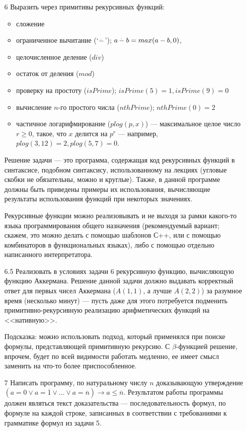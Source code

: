 \documentclass[11pt,a4paper,oneside]{book}
\begin{document}
\begin{enumerate}
\item[6] Выразить через примитивы рекурсивных функций:
\begin{itemize}
\item сложение
\item ограниченное вычитание (`$\mathop{-^{\hspace{-.55em}\cdot}\,\,}$'); $a \mathop{-^{\hspace{-.55em}\cdot}\,\,} b = max (a-b,0)$,
\item целочисленное деление ($div$)
\item остаток от деления ($mod$)
\item проверку на простоту ($isPrime$); $isPrime(5)=1, isPrime(9)=0$
\item вычисление $n$-го простого числа ($nthPrime$); $nthPrime(0)=2$
\item частичное логарифмирование ($plog(p,x)$) --- максимальное целое число $r \ge 0$,
такое, что $x$ делится на $p^r$ --- например, $plog (3,12) = 2, plog (5,7) = 0$.
\end{itemize}

Решение задачи --- это программа, содержащая код рекурсивных функций в синтаксисе, 
подобном синтаксису, использованному на лекциях (угловые скобки не обязательны,
можно и круглые). Также, в данной
программе должны быть приведены примеры их использования, вычисляющие результаты
использования функций при некоторых значениях.

Рекурсивные функции можно реализовывать и не выходя за рамки какого-то языка программирования
общего назначения (рекомендуемый вариант; скажем, это можно делать с помощью шаблонов С++, 
или с помощью комбинаторов в функциональных языках), либо с помощью отдельно написанного 
интерпретатора.

\item[6.5] Реализовать в условиях задачи 6 рекурсивную функцию, вычисляющую функцию Аккермана.
Решение данной задачи должно выдавать корректный ответ для первых чисел Аккермана 
($A(1,1)$, а лучше $A(2,2)$) за разумное время (несколько минут) --- пусть даже для этого
потребуется подменить примитивно-рекурсивную реализацию арифметических функций на <<нативную>>. 

Подсказка: можно использовать подход, который применялся при поиске формулы, представляющей
примитивную рекурсию. С $\beta$-функцией решение, впрочем, будет по всей видимости работать 
медленно, ее имеет смысл заменить на что-то более приспособленное.

\item[7]Написать программу, по натуральному числу $n$ доказывающую
утверждение $(a=0\vee a=\overline{1} \vee \dots \vee a=\overline{n}) \rightarrow a \le \overline{n}$.
Результатом работы программы должен являться текст доказательства --- последовательность формул, по
формуле на каждой строке, записанных в соответствии с требованиями к грамматике формул из задачи 5.

\end{enumerate}
\end{document}
